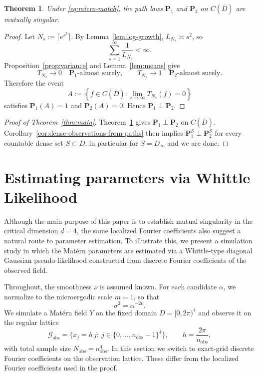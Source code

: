 \documentclass[11pt, reqno]{amsart}
\newtheorem{theorem}{Theorem}
\theoremstyle{remark}
\newcommand{\1}{\mathbf{1}}
\begin{document}
\begin{theorem}\label{thm:path-singularity}
Under \eqref{eq:micro-match}, the path laws $\mathbf P_1$ and $\mathbf P_2$ on $C(\overline D)$ are mutually singular.
\end{theorem}

\begin{proof}
Let $N_s:=\lceil e^{s^2}\rceil$. By Lemma~\ref{lem:log-growth}, $L_{N_s}\asymp s^2$, so
\[
\sum_{s=1}^\infty \frac1{L_{N_s}}<\infty.
\]
Proposition~\ref{prop:variance} and Lemma~\ref{lem:means} give
\[
T_{N_s}\to 0\quad \mathbf P_1\text{-almost surely},
\qquad
T_{N_s}\to 1\quad \mathbf P_2\text{-almost surely}.
\]
Therefore the event
\[
A:=\left\{f\in C(\overline D): \lim_{s \to\infty} T_{N_s}(f)=0\right\}
\]
satisfies $\mathbf P_1(A)=1$ and $\mathbf P_2(A)=0$. Hence $\mathbf P_1\perp \mathbf P_2$.
\end{proof}

\begin{proof}[Proof of Theorem~\ref{thm:main}]
Theorem~\ref{thm:path-singularity} gives $\mathbf P_1\perp \mathbf P_2$ on $C(\overline D)$. Corollary~\ref{cor:dense-observations-from-paths} then implies $\mathbf P_1^S\perp \mathbf P_2^S$ for every countable dense set $S\subset D$, in particular for $S=D_\infty$ and we are done.
\end{proof}


\section{Estimating parameters via Whittle Likelihood}
Although the main purpose of this paper is to establish mutual singularity in the critical dimension \(d=4\), the same localized Fourier coefficients also suggest a natural route to parameter estimation. 
To illustrate this, we present a simulation study in which the Mat\'ern parameters are estimated via a Whittle-type diagonal Gaussian pseudo-likelihood constructed from discrete Fourier coefficients of the observed field. 

Throughout, the smoothness \(\nu\) is assumed known. For each candidate \(\alpha\), we normalize to the microergodic scale \(m=1\), so that
\[
\sigma^2=\alpha^{-2\nu}.
\]
We simulate a Mat\'ern field \(Y\) on the fixed domain
$
D=[0,2\pi)^4$
and observe it on the regular lattice
\[
\mathcal G_{\mathrm{obs}}
=
\{x_j=h\,j:\ j\in\{0,\dots,n_{\mathrm{obs}}-1\}^4\},
\qquad
h=\frac{2\pi}{n_{\mathrm{obs}}},
\]
with total sample size \(N_{\mathrm{obs}}=n_{\mathrm{obs}}^4\). In this section we switch to exact-grid discrete Fourier coefficients on the observation lattice. These differ from the localized Fourier coefficients used in the proof.
\end{document}
